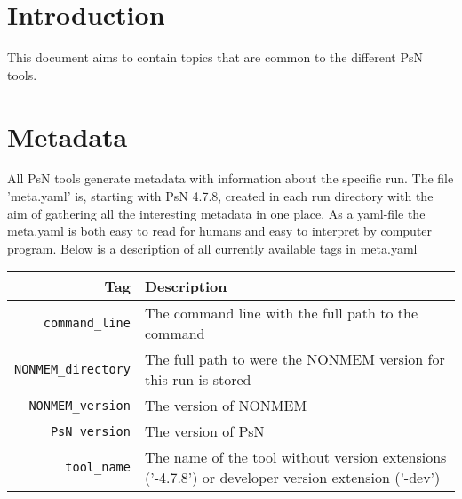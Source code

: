 

\usepackage{tabularx}





\maketitle
\newcommand{\guidetoolname}{<toolname>}

\section{Introduction}
This document aims to contain topics that are common to the different PsN tools.

\section{Metadata}
All PsN tools generate metadata with information about the specific run. The file 'meta.yaml' is, starting with PsN 4.7.8, created in each run directory with the aim of gathering all the interesting metadata in one place. As a yaml-file the meta.yaml is both easy to read for humans and easy to interpret by computer program. Below is a description of all currently available tags in meta.yaml

\begin{center}
    \begin{tabularx}{\linewidth}{ r X }
    \hline
    Tag & Description \\ \hline
    \verb|command_line| & The command line with the full path to the command \\ \hline
    \verb|NONMEM_directory| & The full path to were the NONMEM version for this run is stored \\ \hline
    \verb|NONMEM_version| & The version of NONMEM \\ \hline
    \verb|PsN_version| & The version of PsN \\ \hline
    \verb|tool_name| & The name of the tool without version extensions \mbox{('-4.7.8')} or developer version extension ('-dev') \\ \hline
  \end{tabularx}
\end{center}


